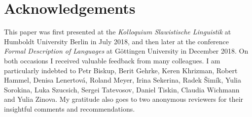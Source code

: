 \documentclass[output=paper,
colorlinks,
citecolor=brown,
newtxmath
]{langscibook}
\begin{document}

\section*{Acknowledgements}

This paper was first presented at the \textit{Kolloquium Slawistische Linguistik} at Humboldt University Berlin in July 2018, and then later at the conference \textit{Formal Description of  Languages} at Göttingen University in December 2018. On both occasions I received valuable feedback from many colleagues. I am particularly indebted to Petr Biskup, Berit Gehrke, Keren Khrizman, Robert Hammel, Denisa Lenertová, Roland Meyer, Irina Sekerina, Radek Šimík, Yulia Sorokina, Luka Szucsich, Sergei Tatevosov, Daniel Tiskin, Claudia Wichmann and Yulia Zinova. My gratitude also goes to two anonymous reviewers for their insightful comments and recommendations.

\sloppy
\printbibliography[heading=subbibliography,notkeyword=this]
\end{document}

